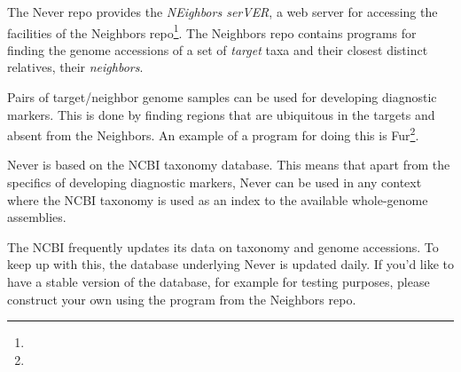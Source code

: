 The Never repo provides the \emph{NEighbors serVER}, a web server for
accessing the facilities of the Neighbors
repo\footnote{}. The Neighbors
repo contains programs for finding the genome accessions of a set of
\emph{target} taxa and their closest distinct relatives, their
\emph{neighbors}.

Pairs of target/neighbor genome samples can be used for developing
diagnostic markers. This is done by finding regions that are
ubiquitous in the targets and absent from the Neighbors. An example of
a program for doing this is
Fur\footnote{}.

Never is based on the NCBI taxonomy database. This means that apart
from the specifics of developing diagnostic markers, Never can be used
in any context where the NCBI taxonomy is used as an index to the
available whole-genome assemblies.

The NCBI frequently updates its data on taxonomy and genome
accessions. To keep up with this, the database underlying Never is
updated daily. If you'd like to have a stable version of the database,
for example for testing purposes, please construct your own using the
program  from the Neighbors repo.
